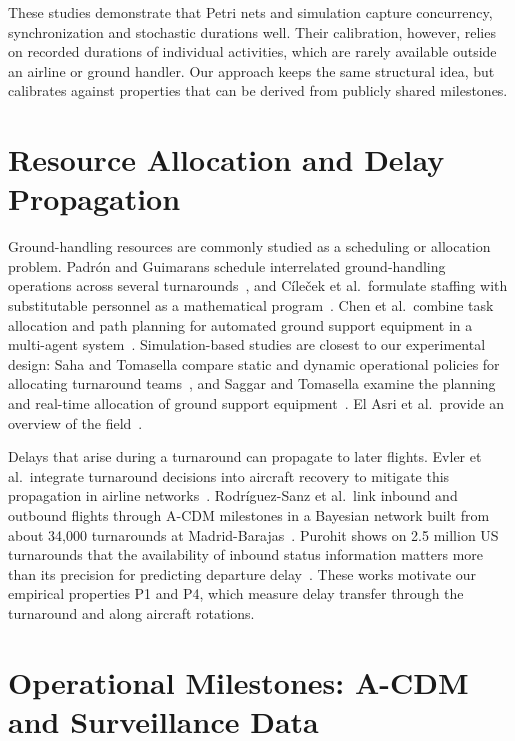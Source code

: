 These studies demonstrate that Petri nets and simulation capture concurrency, synchronization and stochastic durations well. Their calibration, however, relies on recorded durations of individual activities, which are rarely available outside an airline or ground handler. Our approach keeps the same structural idea, but calibrates against properties that can be derived from publicly shared milestones.

\section{Resource Allocation and Delay Propagation}

Ground-handling resources are commonly studied as a scheduling or allocation problem. Padr\'on and Guimarans schedule interrelated ground-handling operations across several turnarounds~\cite{padron2019scheduling}, and C\'ile\v{c}ek et al.\ formulate staffing with substitutable personnel as a mathematical program~\cite{cilecek2024staffing}. Chen et al.\ combine task allocation and path planning for automated ground support equipment in a multi-agent system~\cite{chen2023multiagent}. Simulation-based studies are closest to our experimental design: Saha and Tomasella compare static and dynamic operational policies for allocating turnaround teams~\cite{saha2021policies}, and Saggar and Tomasella examine the planning and real-time allocation of ground support equipment~\cite{saggar2021gse}. El Asri et al.\ provide an overview of the field~\cite{elasri2018review}.

Delays that arise during a turnaround can propagate to later flights. Evler et al.\ integrate turnaround decisions into aircraft recovery to mitigate this propagation in airline networks~\cite{evler2021recovery}. Rodr\'iguez-Sanz et al.\ link inbound and outbound flights through A-CDM milestones in a Bayesian network built from about 34{,}000 turnarounds at Madrid-Barajas~\cite{rodriguezsanz2018uncertainty}. Purohit shows on 2.5 million US turnarounds that the availability of inbound status information matters more than its precision for predicting departure delay~\cite{purohit2026availability}. These works motivate our empirical properties P1 and P4, which measure delay transfer through the turnaround and along aircraft rotations.

\section{Operational Milestones: A-CDM and Surveillance Data}

